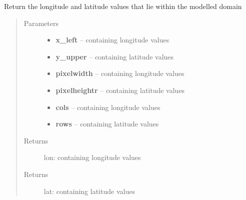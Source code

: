 \documentclass[letterpaper,10pt,english]{sphinxmanual}
\begin{document}
\begin{fulllineitems}
\label{docs/utilities:nctools.get_lat_lon}
Return the longitude and latitude values that lie within
the modelled domain
\begin{quote}\begin{description}
\item[{Parameters}] \leavevmode\begin{itemize}
\item {} 
\textbf{x\_left} --  containing longitude values

\item {} 
\textbf{y\_upper} --  containing latitude values

\item {} 
\textbf{pixelwidth} --  containing longitude values

\item {} 
\textbf{pixelheightr} --  containing latitude values

\item {} 
\textbf{cols} --  containing longitude values

\item {} 
\textbf{rows} --  containing latitude values

\end{itemize}

\item[{Returns}] \leavevmode
lon:  containing longitude values

\item[{Returns}] \leavevmode
lat:  containing latitude values

\end{description}\end{quote}

\end{fulllineitems}


\end{document}
